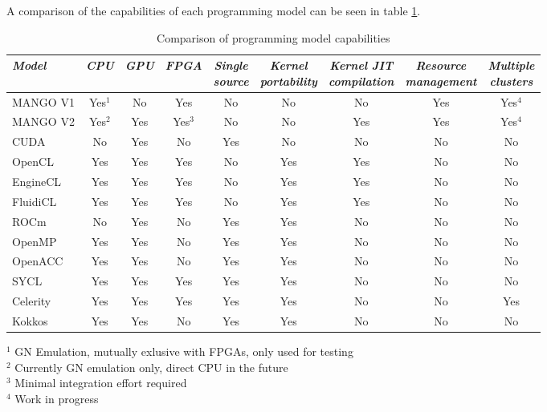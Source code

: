 A comparison of the capabilities of each programming model can be seen in table \ref{tab:progamming-model-comparison}.

\begin{table}[ht]
    \centering
    \begin{tabular}{l|c|c|c|c|c|c|c|c}
    \textit{Model} & \textit{CPU} & \textit{GPU} & \textit{FPGA} & \makecell{\textit{Single} \\ \textit{source}} & \makecell{\textit{Kernel} \\ \textit{portability}} & \makecell{\textit{Kernel JIT} \\ \textit{compilation}} & \makecell{\textit{Resource} \\ \textit{management}} & \makecell{\textit{Multiple} \\ \textit{clusters}} \\ \hline
    MANGO V1 & Yes$^1$ & No & Yes & No & No & No & Yes & Yes$^4$ \\
    MANGO V2 & Yes$^2$ & Yes & Yes$^3$ & No & No & Yes & Yes & Yes$^4$ \\
    CUDA & No & Yes & No & Yes & No & No & No & No \\
    OpenCL & Yes & Yes & Yes & No & Yes & Yes & No & No \\
    EngineCL & Yes & Yes & Yes & No & Yes & Yes & No & No \\
    FluidiCL & Yes & Yes & Yes & No & Yes & Yes & No & No \\
    ROCm & No & Yes & No & Yes & Yes & No & No & No \\
    OpenMP & Yes & Yes & No & Yes & Yes & No & No & No  \\
    OpenACC & Yes & Yes & No & Yes & Yes & No & No & No  \\
    SYCL & Yes & Yes & Yes & Yes & Yes & No & No & No \\
    Celerity & Yes & Yes & Yes & Yes & Yes & No & No & Yes \\
    Kokkos & Yes & Yes & No & Yes & Yes & No & No & No 
    \end{tabular}
    \begin{flushleft}
    \footnotesize{
        $^1$ GN Emulation, mutually exlusive with FPGAs, only used for testing \\ 
        $^2$ Currently GN emulation only, direct CPU in the future \\ 
        $^3$ Minimal integration effort required \\ 
        $^4$ Work in progress
    }
    \end{flushleft}
    \captionsetup{justification=centering}
    \caption{Comparison of programming model capabilities}
    \label{tab:progamming-model-comparison}
\end{table}

